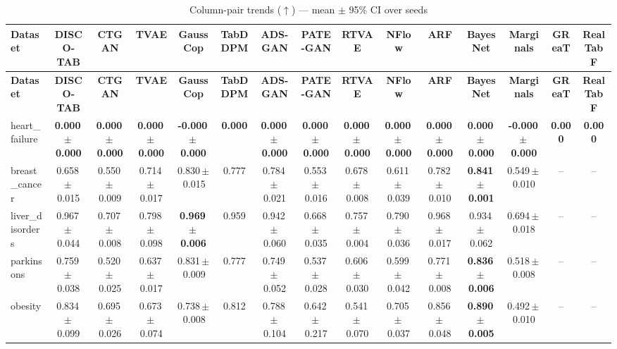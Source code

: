 \documentclass[8pt]{extarticle}
\begin{document}
\begin{longtable}{l*{14}{c}}
\caption{Column-pair trends ($\uparrow$) --- mean $\pm$ 95\% CI over seeds}\\
\toprule
\textbf{Dataset} & \textbf{DISCO-TAB} & \textbf{CTGAN} & \textbf{TVAE} & \textbf{GaussCop} & \textbf{TabDDPM} & \textbf{ADS-GAN} & \textbf{PATE-GAN} & \textbf{RTVAE} & \textbf{NFlow} & \textbf{ARF} & \textbf{BayesNet} & \textbf{Marginals} & \textbf{GReaT} & \textbf{RealTabF} \\
\midrule
\endfirsthead
\toprule
\textbf{Dataset} & \textbf{DISCO-TAB} & \textbf{CTGAN} & \textbf{TVAE} & \textbf{GaussCop} & \textbf{TabDDPM} & \textbf{ADS-GAN} & \textbf{PATE-GAN} & \textbf{RTVAE} & \textbf{NFlow} & \textbf{ARF} & \textbf{BayesNet} & \textbf{Marginals} & \textbf{GReaT} & \textbf{RealTabF} \\
\midrule
\endhead
\bottomrule
\endfoot
heart\_failure & \textbf{0.000\,$\pm$\,0.000} & \textbf{0.000\,$\pm$\,0.000} & \textbf{0.000\,$\pm$\,0.000} & \textbf{-0.000\,$\pm$\,0.000} & \textbf{0.000} & \textbf{0.000\,$\pm$\,0.000} & \textbf{0.000\,$\pm$\,0.000} & \textbf{0.000\,$\pm$\,0.000} & \textbf{0.000\,$\pm$\,0.000} & \textbf{0.000\,$\pm$\,0.000} & \textbf{0.000\,$\pm$\,0.000} & \textbf{-0.000\,$\pm$\,0.000} & \textbf{0.000} & \textbf{0.000} \\
breast\_cancer & 0.658\,$\pm$\,0.015 & 0.550\,$\pm$\,0.009 & 0.714\,$\pm$\,0.017 & 0.830\,$\pm$\,0.015 & 0.777 & 0.784\,$\pm$\,0.021 & 0.553\,$\pm$\,0.016 & 0.678\,$\pm$\,0.008 & 0.611\,$\pm$\,0.039 & 0.782\,$\pm$\,0.010 & \textbf{0.841\,$\pm$\,0.001} & 0.549\,$\pm$\,0.010 & -- & -- \\
liver\_disorders & 0.967\,$\pm$\,0.044 & 0.707\,$\pm$\,0.008 & 0.798\,$\pm$\,0.098 & \textbf{0.969\,$\pm$\,0.006} & 0.959 & 0.942\,$\pm$\,0.060 & 0.668\,$\pm$\,0.035 & 0.757\,$\pm$\,0.004 & 0.790\,$\pm$\,0.036 & 0.968\,$\pm$\,0.017 & 0.934\,$\pm$\,0.062 & 0.694\,$\pm$\,0.018 & -- & -- \\
parkinsons & 0.759\,$\pm$\,0.038 & 0.520\,$\pm$\,0.025 & 0.637\,$\pm$\,0.017 & 0.831\,$\pm$\,0.009 & 0.777 & 0.749\,$\pm$\,0.052 & 0.537\,$\pm$\,0.028 & 0.606\,$\pm$\,0.030 & 0.599\,$\pm$\,0.042 & 0.771\,$\pm$\,0.008 & \textbf{0.836\,$\pm$\,0.006} & 0.518\,$\pm$\,0.008 & -- & -- \\
obesity & 0.834\,$\pm$\,0.099 & 0.695\,$\pm$\,0.026 & 0.673\,$\pm$\,0.074 & 0.738\,$\pm$\,0.008 & 0.812 & 0.788\,$\pm$\,0.104 & 0.642\,$\pm$\,0.217 & 0.541\,$\pm$\,0.070 & 0.705\,$\pm$\,0.037 & 0.856\,$\pm$\,0.048 & \textbf{0.890\,$\pm$\,0.005} & 0.492\,$\pm$\,0.010 & -- & -- \\

\end{longtable}
\end{document}
